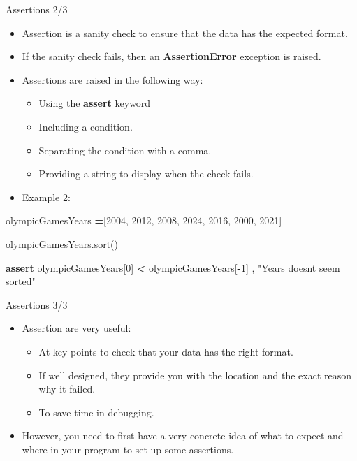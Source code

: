 \documentclass[
  8pt,
  ignorenonframetext,
]{beamer}
\newenvironment{Shaded}{\begin{snugshade}}{\end{snugshade}}
\newcommand{\ControlFlowTok}[1]{\textcolor[rgb]{0.13,0.29,0.53}{\textbf{#1}}}
\newcommand{\DecValTok}[1]{\textcolor[rgb]{0.00,0.00,0.81}{#1}}
\newcommand{\NormalTok}[1]{#1}
\newcommand{\OperatorTok}[1]{\textcolor[rgb]{0.81,0.36,0.00}{\textbf{#1}}}
\newcommand{\StringTok}[1]{\textcolor[rgb]{0.31,0.60,0.02}{#1}}
\providecommand{\tightlist}{%
  \setlength{\itemsep}{0pt}\setlength{\parskip}{0pt}}
\begin{document}
\begin{frame}[fragile]{Assertions 2/3}
\protect\hypertarget{assertions-23}{}
\begin{itemize}
\item
  Assertion is a sanity check to ensure that the data has the expected
  format.
\item
  If the sanity check fails, then an \textbf{AssertionError} exception
  is raised.
\item
  Assertions are raised in the following way:

  \begin{itemize}
  \tightlist
  \item
    Using the \textbf{assert} keyword
  \item
    Including a condition.
  \item
    Separating the condition with a comma.
  \item
    Providing a string to display when the check fails.
  \end{itemize}
\item
  Example 2:
\end{itemize}

\begin{Shaded}
\begin{Highlighting}[]
\NormalTok{olympicGamesYears }\OperatorTok{=}\NormalTok{[}\DecValTok{2004}\NormalTok{, }\DecValTok{2012}\NormalTok{, }\DecValTok{2008}\NormalTok{, }\DecValTok{2024}\NormalTok{, }\DecValTok{2016}\NormalTok{, }\DecValTok{2000}\NormalTok{, }\DecValTok{2021}\NormalTok{]}

\NormalTok{olympicGamesYears.sort()}

\ControlFlowTok{assert}\NormalTok{ olympicGamesYears[}\DecValTok{0}\NormalTok{] }\OperatorTok{\textless{}}\NormalTok{ olympicGamesYears[}\OperatorTok{{-}}\DecValTok{1}\NormalTok{] , }\StringTok{"Years doesn\textquotesingle{}t seem sorted"}
\end{Highlighting}
\end{Shaded}
\end{frame}

\begin{frame}{Assertions 3/3}
\protect\hypertarget{assertions-33}{}
\begin{itemize}
\tightlist
\item
  Assertion are very useful:

  \begin{itemize}
  \tightlist
  \item
    At key points to check that your data has the right format.
  \item
    If well designed, they provide you with the location and the exact
    reason why it failed.
  \item
    To save time in debugging.
  \end{itemize}
\item
  However, you need to first have a very concrete idea of what to expect
  and where in your program to set up some assertions.
\end{itemize}
\end{frame}
\end{document}
